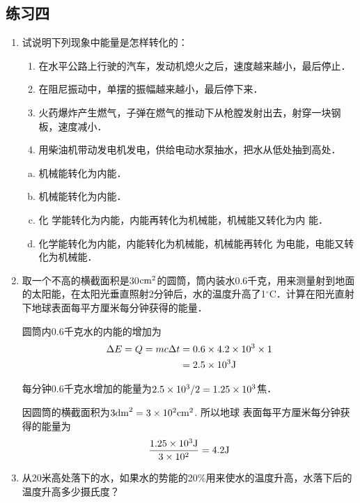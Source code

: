 \subsection{练习四}

\begin{enumerate}
	\item 试说明下列现象中能量是怎样转化的：
	\begin{enumerate}
		\item 在水平公路上行驶的汽车，发动机熄火之后，速度越来越小，最后停止．
		\item 在阻尼振动中，单摆的振幅越来越小，最后停下来．
		\item 火药爆炸产生燃气，子弹在燃气的推动下从枪膛发射出去，射穿一块钢板，速度减小．
		\item 用柴油机带动发电机发电，供给电动水泵抽水，把水从低处抽到高处．
	\end{enumerate}

\begin{solution}
\begin{enumerate}[(a)]
    \item 机械能转化为内能．\item 机械能转化为内能．\item 化
学能转化为内能，内能再转化为机械能，机械能又转化为内
能．\item 化学能转化为内能，内能转化为机械能，机械能再转化
为电能，电能又转化为机械能．
\end{enumerate}
\end{solution}


\item 取一个不高的横截面积是30${\rm cm^2}$的圆筒，筒内装水0.6千克，用来测量射到地面的太阳能，在太阳光垂直照射2分钟后，水的温度升高了1$^\circ$C．计算在阳光直射下地球表面每平方厘米每分钟获得的能量．

\begin{solution}
圆筒内0.6千克水的内能的增加为
\[\begin{split}
   \Delta E=Q=mc\Delta t&=0.6\times4.2\times10^3\times1\\
&=2.5\times10^3{\rm J} 
\end{split}\]

每分钟0.6千克水增加的能量为$2.5\times 10^3/2=1.25\times
10^3$焦．

因圆筒的横截面积为$3{\rm dm}^2=3\times10^2{\rm cm}^2$. 所以地球
表面每平方厘米每分钟获得的能量为
\[\frac{1.25\times10^3{\rm J}}{3\times10^2}=4.2{\rm J}\]
\end{solution}
\item 从20米高处落下的水，如果水的势能的20\%用来使水的温度升高，水落下后的温度升高多少摄氏度？


\end{enumerate}
